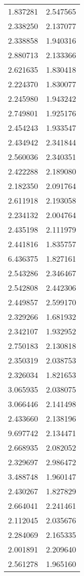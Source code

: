 \begin{longtable}[c]{ll}
    1.837281 & 2.547565 \\
    2.338250 & 2.137077 \\
    2.338858 & 1.940316 \\
    2.880713 & 2.133366 \\
    2.621635 & 1.830418 \\
    2.224370 & 1.830077 \\
    2.245980 & 1.943242 \\
    2.749801 & 1.925176 \\
    2.454243 & 1.933547 \\
    2.434942 & 2.341844 \\
    2.560036 & 2.340351 \\
    2.422288 & 2.189080 \\
    2.182350 & 2.091764 \\
    2.611918 & 2.193058 \\
    2.234132 & 2.004764 \\
    2.435198 & 2.111979 \\
    2.441816 & 1.835757 \\
    6.436375 & 1.827161 \\
    2.543286 & 2.346467 \\
    2.542808 & 2.442306 \\
    2.449857 & 2.599170 \\
    2.329266 & 1.681932 \\
    2.342107 & 1.932952 \\
    2.750183 & 2.130818 \\
    2.350319 & 2.038753 \\
    2.326034 & 1.821653 \\
    3.065935 & 2.038075 \\
    3.066446 & 2.141498 \\
    2.433660 & 2.138196 \\
    9.697742 & 2.134471 \\
    2.668935 & 2.082052 \\
    2.329697 & 2.986472 \\
    3.488748 & 1.960147 \\
    2.430267 & 1.827829 \\
    2.664041 & 2.241461 \\
    2.112045 & 2.035676 \\
    2.284069 & 2.165335 \\
    2.001891 & 2.209640 \\
    2.561278 & 1.965160 \\

\end{longtable}
